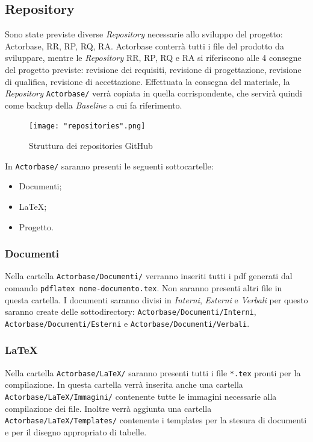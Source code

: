 \documentclass[a4paper]{report}
\begin{document}
	\subsection{Repository}
	Sono state previste diverse \emph{Repository} necessarie allo sviluppo del progetto: Actorbase, 
	RR, RP, RQ, RA. 	Actorbase conterrà tutti i file del prodotto da sviluppare, mentre le
	 \emph{Repository} RR, RP, RQ e RA si riferiscono alle 4 consegne del progetto previste: 
	 revisione dei requisiti, revisione di progettazione, revisione di qualifica, revisione di
	  accettazione. Effettuata la consegna del materiale, la \emph{Repository} 
	  \verb|Actorbase/| verrà copiata in quella corrispondente, che servirà quindi come 
	  backup della \emph{Baseline} a cui fa riferimento.
  	\begin{figure}[H]
		\centering
		\texttt{[image: "repositories".png]}
		\caption{Struttura dei repositories GitHub}
	\end{figure}
	In \verb|Actorbase/| saranno presenti le seguenti sottocartelle:
	\begin{itemize}
		\item Documenti;
		\item LaTeX;
		\item Progetto.
	\end{itemize}
	\subsubsection{Documenti}
	Nella cartella \verb|Actorbase/Documenti/| verranno inseriti tutti i pdf generati dal comando \verb|pdflatex nome-documento.tex|. Non 
	saranno presenti altri file in questa cartella. I documenti saranno divisi in \emph{Interni}, \emph{Esterni} e 
	\emph{Verbali} per questo saranno create delle sottodirectory: \verb|Actorbase/Documenti/Interni|, \verb|Actorbase/Documenti/Esterni|
	e \verb|Actorbase/Documenti/Verbali|.
	\subsubsection{LaTeX}
	Nella cartella \verb|Actorbase/LaTeX/| saranno presenti tutti i file \verb|*.tex| pronti per la compilazione. In questa cartella verrà inserita
	anche una cartella\\ \verb|Actorbase/LaTeX/Immagini/| contenente tutte le immagini necessarie alla compilazione dei file.
	Inoltre verrà aggiunta una cartella \verb|Actorbase/LaTeX/Templates/| contenente i templates per la stesura di documenti e per il
	disegno appropriato di tabelle. 
\end{document}
